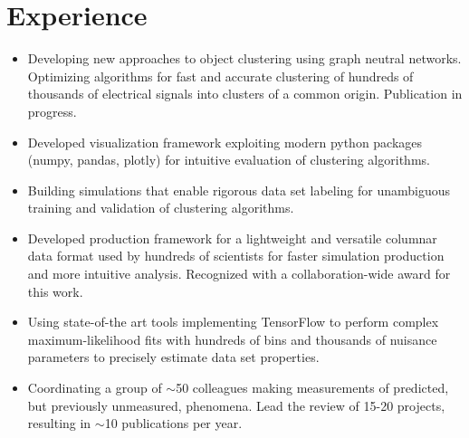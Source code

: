 \documentclass[9pt,a4paper]{moderncv}
\begin{document}
\section{Experience}
{
\begin{itemize}
    \item Developing new approaches to object clustering using graph neutral networks. Optimizing algorithms for fast and accurate clustering of hundreds of thousands of electrical signals into clusters of a common origin. Publication in progress.
    \item Developed visualization framework exploiting modern python packages (numpy, pandas, plotly) for intuitive evaluation of clustering algorithms.
    \item Building simulations that enable rigorous data set labeling for unambiguous training and validation of clustering algorithms.
    \item Developed production framework for a lightweight and versatile columnar data format used by hundreds of scientists for faster simulation production and more intuitive analysis. Recognized with a collaboration-wide award for this work.
    \item Using state-of-the art tools implementing TensorFlow to perform complex maximum-likelihood fits with hundreds of bins and thousands of nuisance parameters to precisely estimate data set properties.
    \item Coordinating a group of $\sim$50 colleagues making measurements of predicted, but previously unmeasured, phenomena. Lead the review of 15-20 projects, resulting in $\sim$10 publications per year.
\end{itemize}
}
\end{document}
